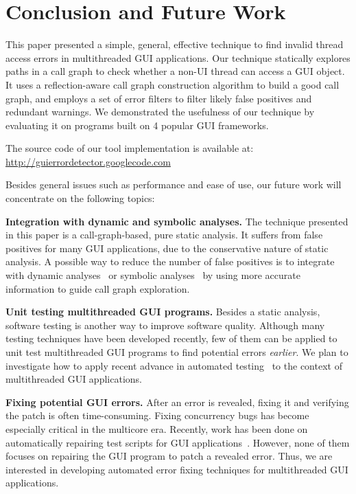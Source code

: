 \smallstep
\section{Conclusion and Future Work}

This paper presented a simple, general, effective technique to find invalid
thread access errors in multithreaded GUI applications. 
Our technique statically explores paths in a call graph to check
whether a non-UI thread can access a GUI object.
It uses a reflection-aware call graph construction algorithm
to build a good call graph, and employs a set of error
filters to filter likely false positives and redundant warnings.
We demonstrated the usefulness of our technique
by evaluating it on \subnum programs built on 4 popular GUI
frameworks. 

The source code of our tool implementation is available at: \\
\url{http://guierrordetector.googlecode.com}

\vspace{1mm}


Besides general issues such as performance and ease of use, our future
work will concentrate on the following topics:

\textbf{Integration with dynamic and symbolic analyses.} The technique 
presented in this paper is a call-graph-based, pure static analysis. 
It suffers from false positives for many GUI applications,
due to the conservative nature of static analysis.
A possible way to reduce the number of false
positives is to integrate with
dynamic analyses~\cite{ZhangSBE2011}
or symbolic analyses~\cite{xie05:symstra, Pasareanu:2011}
by using more accurate information to guide call graph exploration.

\textbf{Unit testing multithreaded GUI programs.} Besides
a static analysis,  software testing is another
way to improve software quality.  Although many
testing techniques have been developed recently, few of them can be applied
to unit test multithreaded GUI programs to find potential errors \textit{earlier}. We
plan to investigate how to apply recent advance in automated
testing~\cite{ZhangSBE2011, Jagannath:2011:IMU:2025113.2025145}
to the context of multithreaded GUI applications.


\textbf{Fixing potential GUI errors.} After an error is revealed, fixing
it and verifying the patch is often time-consuming. Fixing concurrency
bugs has become especially critical in the multicore era.
Recently, work has been done
on automatically repairing test scripts for GUI applications~\cite{Daniel:2011:AGR:2002931.2002937, Huang:2010:RGT:1828417.1828465}. However, none of them focuses on repairing
the GUI program to patch a revealed error. Thus, we are interested in 
developing automated error fixing techniques for
multithreaded GUI applications.

